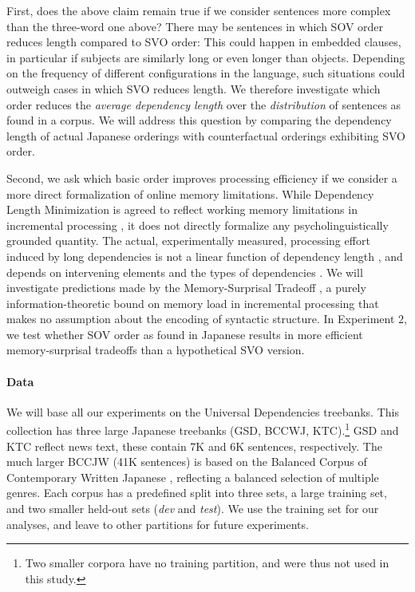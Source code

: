 \documentclass[11pt,a4paper]{article}
\begin{document}
First, does the above claim remain true if we consider sentences more complex than the three-word one above? 
There may be sentences in which SOV order reduces length compared to SVO order:
This could happen in embedded clauses, in particular if subjects are similarly long or even longer than objects.
Depending on the frequency of different configurations in the language, such situations could outweigh cases in which SVO reduces length.
We therefore investigate which order reduces the \emph{average dependency length} over the \emph{distribution} of sentences as found in a corpus.
We will address this question by comparing the dependency length of actual Japanese orderings with counterfactual orderings exhibiting SVO order.

Second, we ask which basic order improves processing efficiency
if we consider a more direct formalization of online memory limitations.
While Dependency Length Minimization is agreed to reflect working memory limitations in incremental processing \citep{hawkins1994performance, futrell2015largescale, temperley2018minimizing}, it does not directly formalize any psycholinguistically grounded quantity.
The actual, experimentally measured, processing effort induced by long dependencies is not a linear function of dependency length \citep{gibson1998linguistic}, and depends on intervening elements \citep{gibson1998linguistic, lewis-activation-based-2005} and the types of dependencies \citep{demberg-data-2008}.
We will investigate predictions made by  %
the Memory-Surprisal Tradeoff \citep{hahn2019memory}, a purely information-theoretic bound on memory load in incremental processing that makes no assumption about the encoding of syntactic structure.
In Experiment 2, we test whether SOV order as found in Japanese results in more efficient memory-surprisal tradeoffs than a hypothetical SVO version.

\paragraph{Data}
We will base all our experiments on the Universal Dependencies \citep{nivre2019universal} treebanks.
This collection has three large Japanese treebanks (GSD, BCCWJ, KTC).\footnote{Two smaller corpora have no training partition, and were thus not used in this study.}
GSD and KTC reflect news text, these contain 7K and 6K sentences, respectively.
The much larger BCCJW (41K sentences) is based on the Balanced Corpus of Contemporary Written Japanese \citep{Maekawa2014}, reflecting a balanced selection of multiple genres.
Each corpus has a predefined split into three sets, a large training set, and two smaller held-out sets (\textit{dev} and \textit{test}).
We use the training set for our analyses, and leave to other partitions for future experiments.
\end{document}
